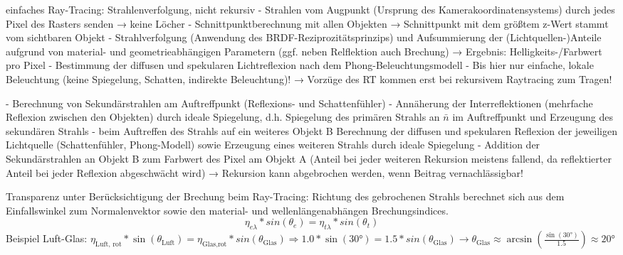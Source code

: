 \documentclass[10pt,landscape]{article}
\makeatletter
\renewcommand{\subsection}{\@startsection{subsection}{2}{0mm}%
                                {-1explus -.5ex minus -.2ex}%
                                {0.5ex plus .2ex}%
                                {\normalfont\normalsize\bfseries}}
\makeatother
\begin{document}
\begin{multicols}{3}
einfaches Ray-Tracing: Strahlenverfolgung, nicht rekursiv
- Strahlen vom Augpunkt (Ursprung des Kamerakoordinatensystems) durch jedes Pixel des Rasters senden → keine Löcher
- Schnittpunktberechnung mit allen Objekten → Schnittpunkt mit dem größtem z-Wert stammt vom sichtbaren Objekt
- Strahlverfolgung (Anwendung des BRDF-Reziprozitätsprinzips) und Aufsummierung der (Lichtquellen-)Anteile aufgrund von material- und geometrieabhängigen Parametern (ggf. neben Relflektion auch Brechung) → Ergebnis: Helligkeits-/Farbwert pro Pixel
- Bestimmung der diffusen und spekularen Lichtreflexion nach dem Phong-Beleuchtungsmodell
- Bis hier nur einfache, lokale Beleuchtung (keine Spiegelung, Schatten, indirekte Beleuchtung)! → Vorzüge des RT kommen erst bei rekursivem Raytracing zum Tragen!


- Berechnung von Sekundärstrahlen am Auftreffpunkt (Reflexions- und Schattenfühler)
- Annäherung der Interreflektionen (mehrfache Reflexion zwischen den Objekten) durch ideale Spiegelung, d.h. Spiegelung des primären Strahls an $\bar{n}$ im Auftreffpunkt und Erzeugung des sekundären Strahls
- beim Auftreffen des Strahls auf ein weiteres Objekt B Berechnung der diffusen und spekularen Reflexion der jeweiligen Lichtquelle (Schattenfühler, Phong-Modell) sowie Erzeugung eines weiteren Strahls durch ideale Spiegelung
- Addition der Sekundärstrahlen an Objekt B zum Farbwert des Pixel am Objekt A (Anteil bei jeder weiteren Rekursion meistens fallend, da reflektierter Anteil bei jeder Reflexion abgeschwächt wird) → Rekursion kann abgebrochen werden, wenn Beitrag vernachlässigbar!


Transparenz unter Berücksichtigung der Brechung beim Ray-Tracing: Richtung des gebrochenen Strahls berechnet sich aus dem Einfallswinkel zum Normalenvektor sowie den material- und wellenlängenabhängen Brechungsindices.
$$\eta_{e\lambda}*sin(\theta_e) = \eta_{t\lambda}*sin(\theta_t)$$
Beispiel Luft-Glas: $\eta_{\text{Luft, rot}}*\sin(\theta_{\text{Luft}})=\eta_{\text{Glas,rot}}*sin(\theta_{\text{Glas}}) \Rightarrow 1.0*\sin(30°)=1.5*sin(\theta_{\text{Glas}})\rightarrow \theta_{\text{Glas}} \approx \arcsin(\frac{\sin(30°)}{1.5})\approx 20°$


\end{multicols}
\end{document}
